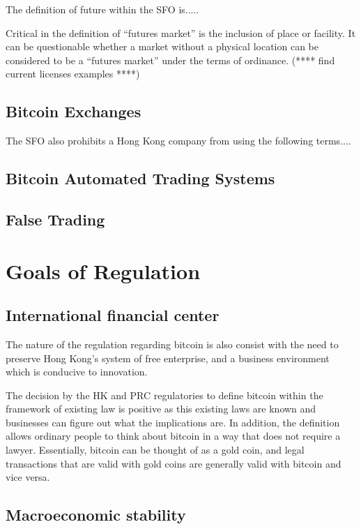 The definition of future within the SFO is.....

Critical in the definition of ``futures market'' is the inclusion of
place or facility.  It can be questionable whether a market without a
physical location can be considered to be a ``futures market'' under
the terms of ordinance.  (**** find current licenses examples ****)

\subsection{Bitcoin Exchanges}

The SFO also prohibits a Hong Kong company from using the following terms....

\subsection{Bitcoin Automated Trading Systems}

\subsection{False Trading}

\section{Goals of Regulation}

\subsection{International financial center}

The nature of the regulation regarding bitcoin is also consist with
the need to preserve Hong Kong's system of free enterprise, and a
business environment which is conducive to innovation.

The decision by the HK and PRC regulatories to define bitcoin within
the framework of existing law is positive as this existing laws are
known and businesses can figure out what the implications are.  In
addition, the definition allows ordinary people to think about bitcoin
in a way that does not require a lawyer.  Essentially, bitcoin can be
thought of as a gold coin, and legal transactions that are valid with
gold coins are generally valid with bitcoin and vice versa.

\subsection{Macroeconomic stability}

